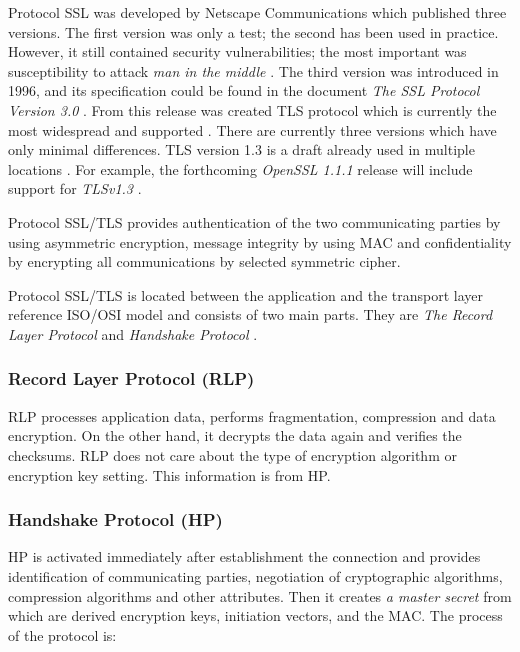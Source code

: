 \documentclass[
  twoside, 12pt, 
  printed, %
  notable,   %
  lof,     %
  lot,     %
]{fithesis3}
\begin{document}
Protocol SSL was developed by Netscape Communications which published three versions. The first 
version was only a test; the second has been used in practice. However, it still contained 
security vulnerabilities; the most important was susceptibility to attack \textit{man in the 
middle} \cite{oppliger2003security}. %
The third version was introduced in 1996, and its specification could be found in the document 
\textit{The SSL Protocol Version 3.0} \cite{freier2011secure}. From this release was created TLS 
protocol which is currently the most widespread and supported \cite{oppliger2003security}. 
There are currently three versions which have only minimal differences. TLS version 1.3 is a 
draft already used in multiple locations \cite{draft-tls}. For example, the forthcoming 
\textit{OpenSSL 1.1.1} release will include support for \textit{TLSv1.3} \cite{foundation2}.

Protocol SSL/TLS provides authentication of the two communicating parties by using asymmetric 
encryption, message integrity by using MAC and confidentiality by encrypting all 
communications by selected symmetric cipher.

Protocol SSL/TLS is located between the application and the transport layer reference ISO/OSI 
model and consists of two main parts. They are \textit{The Record Layer Protocol} and 
\textit{Handshake Protocol} \cite{oppliger2003security}. %

\subsubsection{Record Layer Protocol (RLP)}

RLP processes application data, performs fragmentation, compression and data encryption. On the 
other hand, it decrypts the data again and verifies the checksums. RLP does not care about the 
type of encryption algorithm or encryption key setting. This information is from HP.

\subsubsection{Handshake Protocol (HP)}
HP is activated immediately after establishment the connection and provides identification of 
communicating parties, negotiation of cryptographic algorithms, compression algorithms and other 
attributes. Then it creates \textit{a master secret} from which are derived encryption keys, 
initiation vectors, and the MAC. The process of the protocol is:
\end{document}
